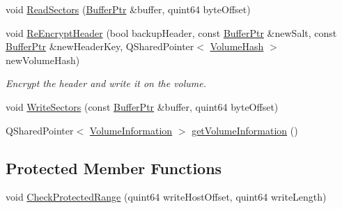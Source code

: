 \begin{DoxyCompactItemize}
\item 
void \hyperlink{class_gost_crypt_1_1_volume_1_1_volume_a3fa2268b80039d55b3402e55bfe52a8d}{Read\+Sectors} (\hyperlink{class_gost_crypt_1_1_buffer_ptr}{Buffer\+Ptr} \&buffer, quint64 byte\+Offset)
\item 
void \hyperlink{class_gost_crypt_1_1_volume_1_1_volume_a0025ff1fb7ab43176b5266ea6fdfbcf0}{Re\+Encrypt\+Header} (bool backup\+Header, const \hyperlink{class_gost_crypt_1_1_buffer_ptr}{Buffer\+Ptr} \&new\+Salt, const \hyperlink{class_gost_crypt_1_1_buffer_ptr}{Buffer\+Ptr} \&new\+Header\+Key, Q\+Shared\+Pointer$<$ \hyperlink{class_gost_crypt_1_1_volume_1_1_volume_hash}{Volume\+Hash} $>$ new\+Volume\+Hash)
\begin{DoxyCompactList}\small\item\em Encrypt the header and write it on the volume. \end{DoxyCompactList}\item 
void \hyperlink{class_gost_crypt_1_1_volume_1_1_volume_a95bf9ebdc2be2c67829f7082c4ba45ab}{Write\+Sectors} (const \hyperlink{class_gost_crypt_1_1_buffer_ptr}{Buffer\+Ptr} \&buffer, quint64 byte\+Offset)
\item 
Q\+Shared\+Pointer$<$ \hyperlink{struct_gost_crypt_1_1_volume_1_1_volume_information}{Volume\+Information} $>$ \hyperlink{class_gost_crypt_1_1_volume_1_1_volume_a0bf67261915d51be7b3363b5f7fa771c}{get\+Volume\+Information} ()
\end{DoxyCompactItemize}
\subsection*{Protected Member Functions}
\begin{DoxyCompactItemize}
\item 
void \hyperlink{class_gost_crypt_1_1_volume_1_1_volume_ac017a0e293b1fc5933af41dba214d1bb}{Check\+Protected\+Range} (quint64 write\+Host\+Offset, quint64 write\+Length)
\end{DoxyCompactItemize}
